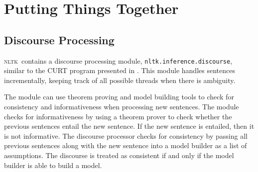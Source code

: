 \documentclass[11pt,a4paper]{article}
\newcommand{\NLTK}{\textsc{nltk}}
\newcommand{\dhgcode}[1]{{\tt #1}}
\begin{document}


\section{Putting Things Together}

\subsection{Discourse Processing}
\NLTK\ contains a discourse processing module,
\dhgcode{nltk.inference.discourse}, similar to the CURT program
presented in \cite{BB}.  This module handles sentences incrementally,
keeping track of all possible threads when there is ambiguity.

The module can use theorem proving and model building tools to check
for consistency and informativeness when processing new sentences.
The module checks for informativeness by using a theorem prover to
check whether the previous sentences entail the new sentence.  If the
new sentence is entailed, then it is not informative.  The discourse
processor checks for consistency by passing all previous sentences
along with the new sentence into a model builder as a list of
assumptions.  The discourse is treated as consistent if and only if
the model builder is able to build a model.

\end{document}
